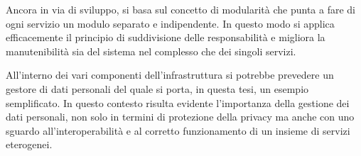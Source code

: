 Ancora in via di sviluppo, si basa sul concetto di modularità che punta a fare di ogni servizio un modulo separato e indipendente. In questo modo si applica efficacemente il principio di suddivisione delle responsabilità e migliora la manutenibilità sia del sistema nel complesso che dei singoli servizi.

All’interno dei vari componenti dell’infrastruttura si potrebbe prevedere un gestore di dati personali del quale si porta, in questa tesi, un esempio semplificato. In questo contesto risulta evidente l’importanza della gestione dei dati personali, non solo in termini di protezione della privacy ma anche con uno sguardo all’interoperabilità e al corretto funzionamento di un insieme di servizi eterogenei.


